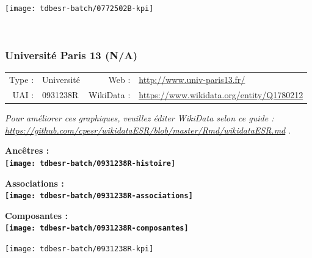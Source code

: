\documentclass[12pt,french,]{article}
\begin{document}
\begin{center}\texttt{[image: tdbesr-batch/0772502B-kpi]} \end{center}\checkoddpage

\ifoddpage \fi ~\newpage  

\hypertarget{universituxe9-paris-13-na}{%
\subsubsection{Université Paris 13
(N/A)}\label{universituxe9-paris-13-na}}

\begin{tabular*}{\textwidth}{rp{5cm}rl}  
\hline  
Type : & Université & Web : &\href{http://www.univ-paris13.fr/}{http://www.univ-paris13.fr/} \\  
UAI : & 0931238R & WikiData : & \href{https://www.wikidata.org/entity/Q1780212}{https://www.wikidata.org/entity/Q1780212} \\  
\hline  
\end{tabular*}

\textit{\scriptsize Pour améliorer ces graphiques, veuillez éditer WikiData selon ce guide :  \href{https://github.com/cpesr/wikidataESR/blob/master/Rmd/wikidataESR.md}{https://github.com/cpesr/wikidataESR/blob/master/Rmd/wikidataESR.md}}
.

\vspace{1cm}  
\begin{minipage}[b]{0.50\textwidth}\begin{center} \bf Ancêtres : \\  
\texttt{[image: tdbesr-batch/0931238R-histoire]} \end{center}\end{minipage}\begin{minipage}[b]{0.50\textwidth}\begin{center} \bf Associations : \\  
\texttt{[image: tdbesr-batch/0931238R-associations]} \end{center}\end{minipage}

\hrulefill

\begin{center} \bf Composantes : \\  
\texttt{[image: tdbesr-batch/0931238R-composantes]} \end{center}

\begin{center}\texttt{[image: tdbesr-batch/0931238R-kpi]} \end{center}\checkoddpage
\end{document}
